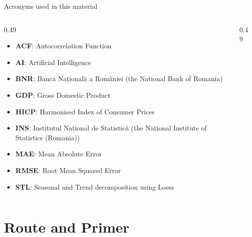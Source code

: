 {
\begin{frame}[noframenumbering]
    \titlepage
\end{frame}
}
\begin{frame}{Acronyms used in this material}
\begin{columns}[T]
\begin{column}{0.49\textwidth}
\begin{itemize}\setlength{\itemsep}{0pt}
    \item \textbf{ACF}: Autocorrelation Function
    \item \textbf{AI}: Artificial Intelligence
    \item \textbf{BNR}: Banca Națională a României (the National Bank of Romania)
    \item \textbf{GDP}: Gross Domestic Product
    \item \textbf{HICP}: Harmonised Index of Consumer Prices
    \item \textbf{INS}: Institutul Național de Statistică (the National Institute of Statistics (Romania))
    \item \textbf{MAE}: Mean Absolute Error
    \item \textbf{RMSE}: Root Mean Squared Error
    \item \textbf{STL}: Seasonal and Trend decomposition using Loess
\end{itemize}
\end{column}
\begin{column}{0.49\textwidth}
\end{column}
\end{columns}
\end{frame}

\section{Route and Primer}


